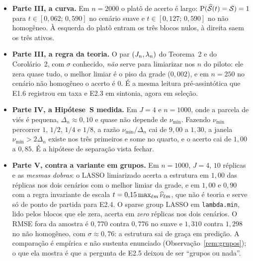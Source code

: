 \documentclass[11pt,a4paper]{article}
\newcommand{\Nhat}[2]{\widehat{\nu}_{#1#2}}
\newcommand{\Shat}{\widehat{\mathcal{S}}}
\newcommand{\sepmin}{\nu_{\min}}
\begin{document}
\begin{itemize}[nosep, leftmargin=*]
    $\min_{S}\lVert\PiJ\gcomp{\cv}{\md}\rVert$ é $0{,}999$ no suave e
    $0{,}778$ no não homogêneo em $n = 2000$. A janela $\sepmin > 2\Delta_{n}$
    existe em todas as células do cenário suave e em \emph{nenhuma} do não
    homogêneo; ainda assim, $\Prob(\Shat = \mathcal{S})$ no melhor limiar da grade é
    $1{,}00$ em todas as células com \texttt{cv.min} a partir de $n = 500$, e
    a fração de réplicas em que \emph{algum} limiar acerta é $1{,}00$ (a
    única exceção é $0{,}95$, em $n = 250$ no não homogêneo). É a assimetria
    do Corolário~\ref{cor:limiar}(ii) contra (iii): o viés de aproximação
    encolhe todas as normas na mesma direção e não cria falso positivo.
  \item \textbf{Parte III, a curva.} Em $n = 2000$ o platô de acerto é largo:
    $\Prob(\Shat(t) = \mathcal{S}) = 1$ para $t \in [0{,}062;\,0{,}590]$ no cenário
    suave e $t \in [0{,}127;\,0{,}590]$ no não homogêneo. À esquerda do platô
    entram os três blocos nulos, à direita saem os três ativos.
  \item \textbf{Parte III, a regra da teoria.} O par $(J_{n},\lambda_{n})$ do
    Teorema~2 e do Corolário~2, com $\sigma$ conhecido, \emph{não} serve para
    limiarizar nos $n$ do piloto: ele zera quase tudo, o melhor limiar é o
    piso da grade ($0{,}002$), e em $n = 250$ no cenário não homogêneo o
    acerto é $0$. É a mesma leitura pré-assintótica que E1.6 registrou em
    taxa e E2.3 em sintonia, agora em seleção.
  \item \textbf{Parte IV, a Hipótese~S medida.} Em $J = 4$ e $n = 1000$, onde
    a parcela de viés é pequena, $\Delta_{n} \approx 0{,}10$ e quase não
    depende de $\sepmin$. Fazendo $\sepmin$ percorrer $1$, $1/2$, $1/4$ e
    $1/8$, a razão $\sepmin/\Delta_{n}$ cai de $9{,}00$ a $1{,}30$, a janela
    $\sepmin > 2\Delta_{n}$ existe nos três primeiros e some no quarto, e o
    acerto cai de $1{,}00$ a $0{,}85$. É a hipótese de separação vista
    fechar.
  \item \textbf{Parte V, contra a variante em grupos.} Em $n = 1000$,
    $J = 4$, $10$ réplicas e as \emph{mesmas dobras}: o LASSO limiarizado
    acerta a estrutura em $1{,}00$ das réplicas nos dois cenários com o
    melhor limiar da grade, e em $1{,}00$ e $0{,}90$ com a regra invariante
    de escala $t = 0{,}15\max_{\cv\md}\Nhat{\cv}{\md}$, que não é teoria e
    serve só de ponto de partida para E2.4. O sparse group LASSO em
    \texttt{lambda.min}, lido pelos blocos que ele zera, acerta em
    \emph{zero} réplicas nos dois cenários. O RMSE fora da amostra é
    $0{,}770$ contra $0{,}776$ no suave e $1{,}310$ contra $1{,}298$ no não
    homogêneo, com $\sigma \approx 0{,}76$: a estrutura sai de graça em
    predição. A comparação é empírica e não sustenta enunciado
    (Observação~\ref{rem:grupos}); o que ela mostra é que a pergunta de E2.5
    deixou de ser ``grupos ou nada''.
\end{itemize}
\end{document}
